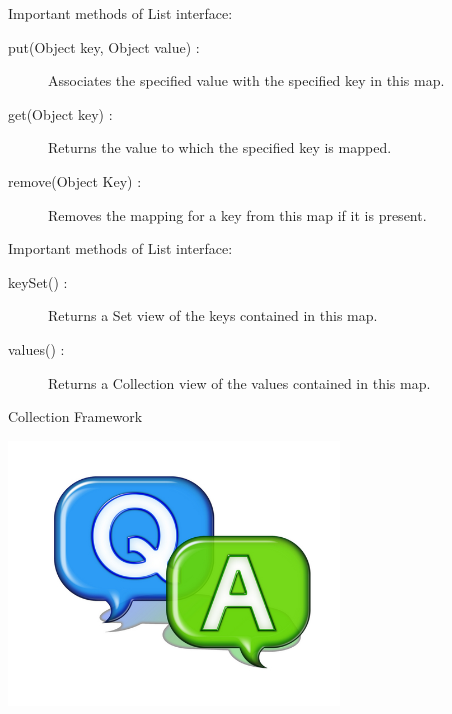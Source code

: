 \documentclass[14pt]{beamer}
\begin{document}
\begin{frame}{Important methods of List interface:}
\begin{description}
\item [put(Object key, Object value) :] Associates the specified value with the specified key in this map.
\item [get(Object key) :] Returns the value to which the specified key is mapped.
\item [remove(Object Key) :] Removes the mapping for a key from this map if it is present.
\end{description}
\end{frame}

\begin{frame}{Important methods of List interface:}
\begin{description}
\item [keySet() :] Returns a Set view of the keys contained in this map.
\item [values() :] Returns a Collection view of the values contained in this map.
\end{description}
\end{frame}


\begin{frame}{Collection Framework}
\begin{center}
\includegraphics[scale=0.4]{COJ-M01-S03-Image27.png}
\end{center}
\end{frame}
\end{document}
